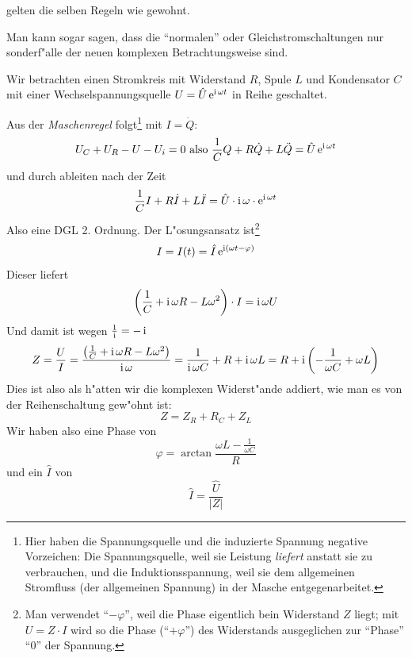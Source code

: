 \begin{Wichtig}
    gelten die selben Regeln
   wie gewohnt.
\end{Wichtig}

Man kann sogar sagen, dass die "`normalen"' oder
Gleichstromschaltungen nur sonderf"alle der neuen komplexen
Betrachtungsweise sind.


\bigskip


Wir betrachten einen Stromkreis mit Widerstand $R$, Spule $L$ und
Kondensator $C$ mit einer Wechselspannungsquelle $U = \hat U \operatorname{e}^{\operatorname{i}
  \omega t}$ in Reihe geschaltet.

Aus der \emph{Maschenregel} folgt\footnote{Hier haben die
  Spannungsquelle und die induzierte Spannung  negative Vorzeichen: Die
  Spannungsquelle, weil sie Leistung \emph{liefert} anstatt sie zu
  verbrauchen, und die Induktionsspannung, weil sie dem allgemeinen
  Stromfluss (der allgemeinen Spannung) in der Masche
  entgegenarbeitet.} mit $I = \dot Q$:
\begin{equation}
   \label{eq:356}
   U_C + U_R - U - U_i = 0 \text{ also } \frac{1}{C}Q + R \dot Q + L
   \ddot Q = \hat U \operatorname{e}^{\operatorname{i} \omega t}
\end{equation}
und durch ableiten nach der Zeit
\begin{equation*}
   \frac{1}{C}I + R \dot I + L \ddot I = \hat U \cdot \operatorname{i} \omega \cdot \operatorname{e}^{\operatorname{i} \omega t}
\end{equation*}
Also eine DGL 2. Ordnung. Der L"osungsansatz ist\footnote{Man verwendet
"`$-\varphi$"', weil die Phase eigentlich bein Widerstand $Z$ liegt;
mit $U = Z \cdot I$ wird so die Phase ("`$+\varphi$"')  des
Widerstands ausgeglichen zur "`Phase"' "`$0$"' der Spannung.}
\begin{equation*}
   \label{eq:359}
   I = I(t) = \hat I \operatorname{e}^{\operatorname{i} (\omega t - \varphi)}
\end{equation*}
Dieser liefert
\begin{equation}
   \label{eq:361}
   \left ( \frac{1}{C} + \operatorname{i} \omega R - L \omega^2 \right ) \cdot I = \operatorname{i}
   \omega U
\end{equation}
Und damit ist wegen $\frac{1}{\operatorname{i}} = -\operatorname{i}$
\begin{equation}
   \label{eq:362}
   Z = \frac{U}{I} = \frac{ \left ( \frac{1}{C} + \operatorname{i} \omega R - L
        \omega^2 \right ) }{\operatorname{i} \omega}
=  \frac{1}{\operatorname{i} \omega C} + R + \operatorname{i} \omega L
= R + \operatorname{i} \left ( - \frac{1}{\omega C}  + \omega L \right )
\end{equation}
Dies ist also als h"atten wir die komplexen Widerst"ande addiert, wie
man es von der Reihenschaltung gew"ohnt ist:
\begin{equation*}
   Z = Z_R + R_C + Z_L
\end{equation*}
Wir haben also eine Phase von
\begin{equation}
   \label{eq:363}
 \boxed{\varphi = \arctan \frac{\omega L - \frac{1}{\omega C}}{R}}
\end{equation}
und ein $\hat I$ von
\begin{equation}
   \label{eq:364}
  \boxed{\hat I = \frac{\hat U}{|Z|}}
\end{equation}



